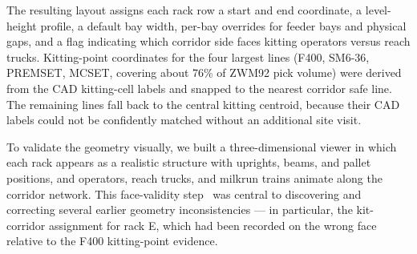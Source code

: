 The resulting layout assigns each rack row a start and end coordinate, a level-height profile, a default bay width, per-bay overrides for feeder bays and physical gaps, and a flag indicating which corridor side faces kitting operators versus reach trucks. Kitting-point coordinates for the four largest lines (F400, SM6-36, PREMSET, MCSET, covering about 76\% of ZWM92 pick volume) were derived from the CAD kitting-cell labels and snapped to the nearest corridor safe line. The remaining lines fall back to the central kitting centroid, because their CAD labels could not be confidently matched without an additional site visit.

To validate the geometry visually, we built a three-dimensional viewer in which each rack appears as a realistic structure with uprights, beams, and pallet positions, and operators, reach trucks, and milkrun trains animate along the corridor network. This face-validity step~\cite{sargent2013} was central to discovering and correcting several earlier geometry inconsistencies — in particular, the kit-corridor assignment for rack E, which had been recorded on the wrong face relative to the F400 kitting-point evidence.
